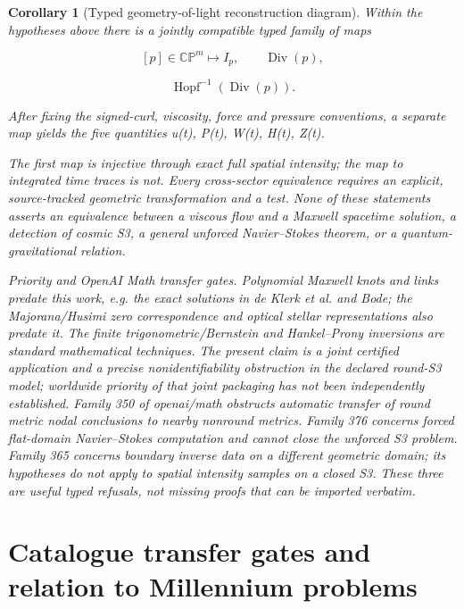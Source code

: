 \documentclass[10pt,letterpaper]{article}
\newtheorem{corollary}[theorem]{Corollary}
\theoremstyle{remark}
\begin{document}
\begin{corollary}[Typed geometry-of-light reconstruction diagram]

Within the hypotheses above there is a jointly compatible typed family of maps


\begin{equation}
\tag{108}\label{eq:108}
[p]\in\mathbb{CP}^m\longmapsto I_p,\qquad\operatorname{Div}(p),
\end{equation}


\begin{equation}
\tag{109}\label{eq:109}
\operatorname{Hopf}^{-1}(\operatorname{Div}(p)).
\end{equation}

After fixing the signed-curl, viscosity, force and pressure conventions, a separate map yields the five quantities u(t), P(t), W(t), H(t), Z(t).


The first map is injective through exact full spatial intensity; the map to integrated time traces is not. Every cross-sector equivalence requires an explicit, source-tracked geometric transformation and a test. None of these statements asserts an equivalence between a viscous flow and a Maxwell spacetime solution, a detection of cosmic S3, a general unforced Navier–Stokes theorem, or a quantum-gravitational relation.


Priority and OpenAI Math transfer gates. Polynomial Maxwell knots and links predate this work, e.g. the exact solutions in de Klerk et al. and Bode; the Majorana/Husimi zero correspondence and optical stellar representations also predate it. The finite trigonometric/Bernstein and Hankel–Prony inversions are standard mathematical techniques. The present claim is a joint certified application and a precise nonidentifiability obstruction in the declared round-S3 model; worldwide priority of that joint packaging has not been independently established. Family 350 of openai/math obstructs automatic transfer of round metric nodal conclusions to nearby nonround metrics. Family 376 concerns forced flat-domain Navier–Stokes computation and cannot close the unforced S3 problem. Family 365 concerns boundary inverse data on a different geometric domain; its hypotheses do not apply to spatial intensity samples on a closed S3. These three are useful typed refusals, not missing proofs that can be imported verbatim.


\end{corollary}

\section{Catalogue transfer gates and relation to Millennium problems}
\end{document}
